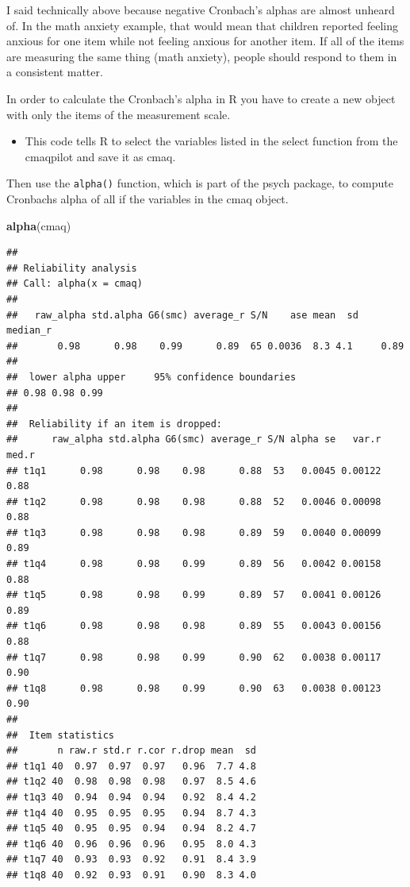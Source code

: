 \documentclass[
]{book}
\newenvironment{Shaded}{\begin{snugshade}}{\end{snugshade}}
\newcommand{\KeywordTok}[1]{\textcolor[rgb]{0.13,0.29,0.53}{\textbf{#1}}}
\newcommand{\NormalTok}[1]{#1}
\newcommand{\OperatorTok}[1]{\textcolor[rgb]{0.81,0.36,0.00}{\textbf{#1}}}
\newcommand{\StringTok}[1]{\textcolor[rgb]{0.31,0.60,0.02}{#1}}
\providecommand{\tightlist}{%
  \setlength{\itemsep}{0pt}\setlength{\parskip}{0pt}}
\begin{document}
I said technically above because negative Cronbach's alphas are almost unheard of. In the math anxiety example, that would mean that children reported feeling anxious for one item while not feeling anxious for another item. If all of the items are measuring the same thing (math anxiety), people should respond to them in a consistent matter.

In order to calculate the Cronbach's alpha in R you have to create a new object with only the items of the measurement scale.

\begin{Shaded}
\end{Shaded}

\begin{itemize}
\tightlist
\item
  This code tells R to select the variables listed in the select function from the cmaqpilot and save it as cmaq.
\end{itemize}

Then use the \texttt{alpha()} function, which is part of the psych package, to compute Cronbachs alpha of all if the variables in the cmaq object.

\begin{Shaded}
\begin{Highlighting}[]
\KeywordTok{alpha}\NormalTok{(cmaq)}
\end{Highlighting}
\end{Shaded}

\begin{verbatim}
## 
## Reliability analysis   
## Call: alpha(x = cmaq)
## 
##   raw_alpha std.alpha G6(smc) average_r S/N    ase mean  sd median_r
##       0.98      0.98    0.99      0.89  65 0.0036  8.3 4.1     0.89
## 
##  lower alpha upper     95% confidence boundaries
## 0.98 0.98 0.99 
## 
##  Reliability if an item is dropped:
##      raw_alpha std.alpha G6(smc) average_r S/N alpha se   var.r med.r
## t1q1      0.98      0.98    0.98      0.88  53   0.0045 0.00122  0.88
## t1q2      0.98      0.98    0.98      0.88  52   0.0046 0.00098  0.88
## t1q3      0.98      0.98    0.98      0.89  59   0.0040 0.00099  0.89
## t1q4      0.98      0.98    0.99      0.89  56   0.0042 0.00158  0.88
## t1q5      0.98      0.98    0.99      0.89  57   0.0041 0.00126  0.89
## t1q6      0.98      0.98    0.98      0.89  55   0.0043 0.00156  0.88
## t1q7      0.98      0.98    0.99      0.90  62   0.0038 0.00117  0.90
## t1q8      0.98      0.98    0.99      0.90  63   0.0038 0.00123  0.90
## 
##  Item statistics 
##       n raw.r std.r r.cor r.drop mean  sd
## t1q1 40  0.97  0.97  0.97   0.96  7.7 4.8
## t1q2 40  0.98  0.98  0.98   0.97  8.5 4.6
## t1q3 40  0.94  0.94  0.94   0.92  8.4 4.2
## t1q4 40  0.95  0.95  0.95   0.94  8.7 4.3
## t1q5 40  0.95  0.95  0.94   0.94  8.2 4.7
## t1q6 40  0.96  0.96  0.96   0.95  8.0 4.3
## t1q7 40  0.93  0.93  0.92   0.91  8.4 3.9
## t1q8 40  0.92  0.93  0.91   0.90  8.3 4.0
\end{verbatim}
\end{document}
